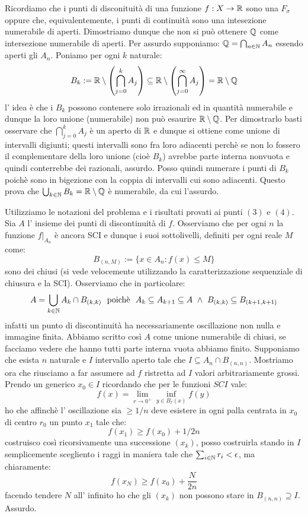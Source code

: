  Ricordiamo che i punti di disconituità di una funzione $f:X\rightarrow \mathbb{R}$ sono una $F_\sigma$ oppure che, equivalentemente, i punti di continuità sono una intesezione numerabile di aperti. Dimostriamo dunque che non si può ottenere $\mathbb{Q}$ come intersezione numerabile di aperti. Per assurdo supponiamo: $\mathbb{Q}=\bigcap_{n\in\mathbb{N}}A_n$ essendo aperti gli $A_n$. Poniamo per ogni $k$ naturale:
$$
B_k:=\mathbb{R}\setminus\left(\bigcap_{j=0}^{k} A_j \right)\subseteq \mathbb{R}\setminus\left(\bigcap_{j=0}^{\infty} A_j \right)=\mathbb{R}\setminus \mathbb{Q}
$$ 
l' idea è che i $B_k$ possono contenere solo irrazionali ed in quantità numerabile e dunque la loro unione (numerabile) non può esaurire $\mathbb{R}\setminus \mathbb{Q}$. Per dimostrarlo basti osservare che $\bigcap_{j=0}^{k} A_j$ è un aperto di $\mathbb{R}$ e dunque si ottiene come unione di intervalli digiunti; questi intervalli sono fra loro adiacenti perchè se non lo fossero il complementare della loro unione (cioè $B_k$) avrebbe parte interna nonvuota e quindi conterrebbe dei razionali, assurdo. Posso quindi numerare i punti di $B_k$ poichè sono in bigezione con la coppia di intervalli cui sono adiacenti. Questo prova che  $\bigcup_{k\in\mathbb{N}} B_k=\mathbb{R}\setminus \mathbb{Q}$ è numerabile, da cui l'assurdo.

 Utilizziamo le notazioni del problema  e i risultati provati ai punti $(3)$ e $(4)$. Sia $A$ l' insieme dei punti di discontinuità di $f$. Osserviamo che per ogni $n$ la funzione $f\vert _{A_n}$ è ancora SCI e dunque i suoi sottolivelli, definiti per ogni reale $M$ come:
$$B_{(n,M)}:=\{x\in A_n: f(x)\leq M\}$$ 
sono dei chiusi (si vede velocemente utilizzando la caratterizzazione sequenziale di chiusura e la SCI). Osserviamo che in particolare: 
$$ A=\bigcup_{k\in \mathbb{N}} A_k\cap B_{(k,k)}\ \mbox{ poichè }\ A_k\subseteq A_{k+1}\subseteq A\ \wedge\ B_{(k,k)}\subseteq B_{(k+1,k+1)} $$
infatti un punto di discontinuità ha necessariamente oscillazione non nulla e immagine finita. Abbiamo scritto così $A$ come unione numerabile di chiusi, se facciamo vedere che hanno tutti parte interna vuota abbiamo finito. Supponiamo che esista $n$ naturale e $I$ intervallo aperto tale che $I\subseteq A_n\cap B_{(n,n)}$. Mostriamo ora che riusciamo a far assumere ad $f$ ristretta ad $I$ valori arbitrariamente grossi. Prendo un generico $x_0\in I$ ricordando che per le funzioni $SCI$ vale:
$$ f(x)=\lim_{r\rightarrow 0^+} \inf_{y\in B_{r}(x)} f(y) $$ 
ho che affinchè l' oscillazione sia $\geq 1/n$ deve esistere in ogni palla centrata in $x_0$ di centro $r_0$ un punto $x_1$ tale che:
$$ f(x_1)\geq f(x_0)+1/2n $$
costruisco così ricorsivamente una successione $(x_k)$, posso costruirla stando in $I$ semplicemente scegliento i raggi in maniera tale che $\sum_{i\in \mathbb{N}} r_i<\epsilon$, ma chiaramente:
$$ f(x_N)\geq f(x_0)+\frac{N}{2n} $$
facendo tendere $N$ all' infinito ho che gli $(x_k)$ non possono stare in $B_{(n,n)}\supseteq I$. Assurdo.

